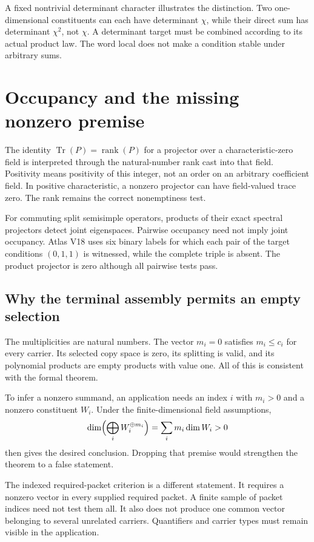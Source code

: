 A fixed nontrivial determinant character illustrates the distinction. Two
one-dimensional constituents can each have determinant $\chi$, while their
direct sum has determinant $\chi^2$, not $\chi$. A determinant target must be
combined according to its actual product law. The word local does not make a
condition stable under arbitrary sums.

\clearpage
\section{Occupancy and the missing nonzero premise}
The identity $\operatorname{Tr}(P)=\operatorname{rank}(P)$ for a projector over a
characteristic-zero field is interpreted through the natural-number rank cast
into that field. Positivity means positivity of this integer, not an order on an
arbitrary coefficient field. In positive characteristic, a nonzero projector can
have field-valued trace zero. The rank remains the correct nonemptiness test.

For commuting split semisimple operators, products of their exact spectral
projectors detect joint eigenspaces. Pairwise occupancy need not imply joint
occupancy. Atlas V18 uses six binary labels for which each pair of the target
conditions $(0,1,1)$ is witnessed, while the complete triple is absent.
The product projector is zero although all pairwise tests pass.

\subsection{Why the terminal assembly permits an empty selection}
The multiplicities are natural numbers. The vector $m_i=0$ satisfies $m_i\le c_i$
for every carrier. Its selected copy space is zero, its splitting is valid, and
its polynomial products are empty products with value one. All of this is
consistent with the formal theorem.

To infer a nonzero summand, an application needs an index $i$ with $m_i>0$ and a
nonzero constituent $W_i$. Under the finite-dimensional field assumptions,
\[
 \dim\Bigl(\bigoplus_i W_i^{\oplus m_i}\Bigr)
       =\sum_i m_i\dim W_i>0
\]
then gives the desired conclusion. Dropping that premise would strengthen the
theorem to a false statement.

The indexed required-packet criterion is a different statement. It requires a
nonzero vector in every supplied required packet. A finite sample of packet
indices need not test them all. It also does not produce one common vector
belonging to several unrelated carriers. Quantifiers and carrier types must
remain visible in the application.

